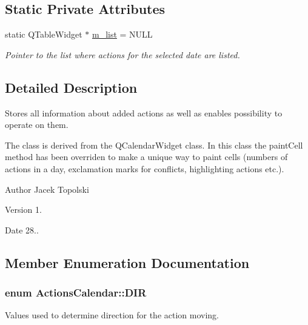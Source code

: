 \subsection*{Static Private Attributes}
\begin{DoxyCompactItemize}
\item 
static Q\-Table\-Widget $\ast$ \hyperlink{class_actions_calendar_a42812597a2424012a160e7755754effa}{m\-\_\-list} = N\-U\-L\-L
\begin{DoxyCompactList}\small\item\em Pointer to the list where actions for the selected date are listed. \end{DoxyCompactList}\end{DoxyCompactItemize}


\subsection{Detailed Description}
Stores all information about added actions as well as enables possibility to operate on them. 

The class is derived from the Q\-Calendar\-Widget class. In this class the paint\-Cell method has been overriden to make a unique way to paint cells (numbers of actions in a day, exclamation marks for conflicts, highlighting actions etc.). \begin{DoxyAuthor}{Author}
Jacek Topolski 
\end{DoxyAuthor}
\begin{DoxyVersion}{Version}
1. 
\end{DoxyVersion}
\begin{DoxyDate}{Date}
28.. 
\end{DoxyDate}


\subsection{Member Enumeration Documentation}
\hypertarget{class_actions_calendar_a8cb1843b3b3a5b8554bbeb512f50b590}{
\subsubsection[{D\-I\-R}]{\setlength{\rightskip}{0pt plus 5cm}enum {\bf Actions\-Calendar\-::\-D\-I\-R}}}\label{class_actions_calendar_a8cb1843b3b3a5b8554bbeb512f50b590}


Values used to determine direction for the action moving. 

